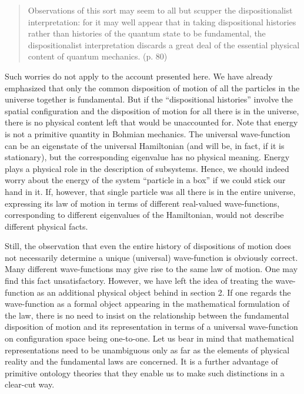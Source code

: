 \documentclass[12pt]{article}
\theoremstyle{definition}
\begin{document}
\begin{quote} Observations of this sort may seem to all but scupper the dispositionalist interpretation: for it may well appear that in taking dispositional histories rather than histories of the quantum state to be fundamental, the dispositionalist interpretation discards a great deal of the essential physical content of quantum mechanics. (p. 80) \end{quote} 

\noindent Such worries do not apply to the account presented here. We have already emphasized that only the common disposition of motion of all the particles in the universe together is fundamental. But if the ``dispositional histories'' involve the spatial configuration and the disposition of motion for all there is in the universe, there is no physical content left that would be unaccounted for. Note that energy is not a primitive quantity in Bohmian mechanics. The universal wave-function can be an eigenstate of the universal Hamiltonian (and will be, in fact, if it is stationary), but the corresponding eigenvalue has no physical meaning. Energy plays a physical role in the description of subsystems. Hence, we should indeed worry about the energy of the system ``particle in a box'' if we could stick our hand in it. If, however, that single particle was all there is in the entire universe, expressing its law of motion in terms of different real-valued wave-functions, corresponding to different eigenvalues of the Hamiltonian, would not describe different physical facts.

Still, the observation that even the entire history of dispositions of motion does not necessarily determine a unique (universal) wave-function is obviously correct. Many different wave-functions may give rise to the same law of motion. One may find this fact unsatisfactory. However, we have left the idea of treating the wave-function as an additional physical object behind in section 2. If one regards the wave-function as a formal object appearing in the mathematical formulation of the law, there is no need to insist on the relationship between the fundamental disposition of motion and its representation in terms of a universal wave-function on configuration space being one-to-one. Let us bear in mind that mathematical representations need to be unambiguous only as far as the elements of physical reality and the fundamental laws are concerned. It is a further advantage of primitive ontology theories that they enable us to make such distinctions in a clear-cut way.
\end{document}
